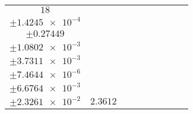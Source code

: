 \documentclass[8pt]{article}
\begin{document}
\begin{longtable}[l]{c c c c c c c c c}
$\num{18}$ & \begin{tabular}[c]{@{}c@{}}$\num{3.0035e-2}$ \\ $\pm\num{1.4245e-4}$\end{tabular} & \begin{tabular}[c]{@{}c@{}}$\num{0.56485}$ \\ $\pm\num{0.27449}$\end{tabular} & \begin{tabular}[c]{@{}c@{}}$\num{11.308}$ \\ $\pm\num{1.0802e-3}$\end{tabular} & \begin{tabular}[c]{@{}c@{}}$\num{1.6206e+3}$ \\ $\pm\num{3.7311e-3}$\end{tabular} & \begin{tabular}[c]{@{}c@{}}$\num{3.2421}$ \\ $\pm\num{7.4644e-6}$\end{tabular} & \begin{tabular}[c]{@{}c@{}}$\num{1.163}$ \\ $\pm\num{6.6764e-3}$\end{tabular} & \begin{tabular}[c]{@{}c@{}}$\num{4.2346}$ \\ $\pm\num{2.3261e-2}$\end{tabular} & $\num{2.3612}$\\
\bottomrule
\end{longtable}
\end{document}
